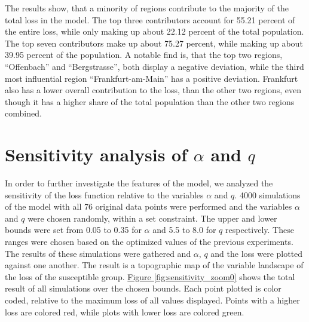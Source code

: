 The results show, that a minority of regions contribute to the majority of the total loss in the model. The top three contributors
account for 55.21 percent of the entire loss, while only making up about 22.12 percent of the total population. The top seven
contributors make up about 75.27 percent, while making up about 39.95 percent of the population. A notable find is, that the
top two regions, ``Offenbach'' and ``Bergstrasse'', both display a negative deviation, while the third most influential region
``Frankfurt-am-Main'' has a positive deviation. Frankfurt also has a lower overall contribution to the loss, than the other
two regions, even though it has a higher share of the total population than the other two regions combined.


\section{Sensitivity analysis of $\alpha$ and $q$}
In order to further investigate the features of the model, we analyzed the sensitivity of the loss function relative to
the variables $\alpha$ and $q$. 4000 simulations of the model with all 76 original data points were performed and the variables
$\alpha$ and $q$ were chosen randomly, within a set constraint. The upper and lower bounds were set from 0.05 to 0.35 for 
$\alpha$ and 5.5 to 8.0 for $q$ respectively. These ranges were chosen based on the optimized values of the previous
experiments. The results of these simulations were gathered and $\alpha$, $q$ and the loss were  plotted against one another.
The result is a topographic map of the variable landscape of the loss of the susceptible group.
\hyperref[fig:sensitivity_zoom0]{Figure \ref*{fig:sensitivity_zoom0}} shows the total result of all simulations over the chosen bounds.
Each point plotted is color coded, relative to the maximum loss of all values displayed. Points with a higher loss are colored red,
while plots with lower loss are colored green.

